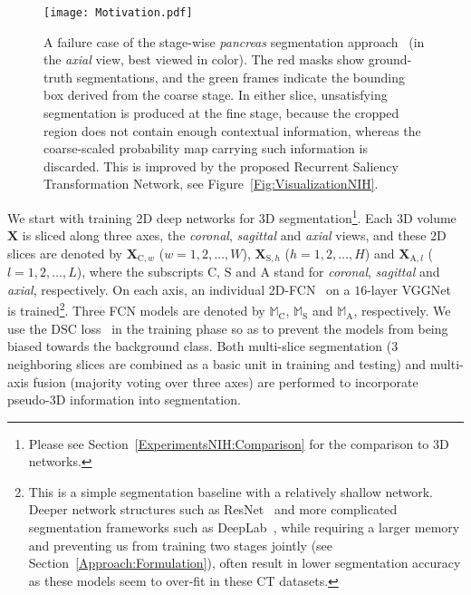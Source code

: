 \documentclass[10pt,twocolumn,letterpaper]{article}
\begin{document}
\renewcommand{\figurewidth}{8.0cm}
\begin{figure}[t]
\begin{center}
    \texttt{[image: Motivation.pdf]}
\end{center}
\caption{
    A failure case of the stage-wise {\em pancreas} segmentation approach~\cite{Zhou_2017_Fixed}
    (in the {\em axial} view, best viewed in color).
    The red masks show ground-truth segmentations,
    and the green frames indicate the bounding box derived from the coarse stage.
    In either slice, unsatisfying segmentation is produced at the fine stage,
    because the cropped region does not contain enough contextual information,
    whereas the coarse-scaled probability map carrying such information is discarded.
    This is improved by the proposed Recurrent Saliency Transformation Network, see Figure~\ref{Fig:VisualizationNIH}.
}
\label{Fig:Motivation}
\end{figure}

We start with training 2D deep networks for 3D segmentation\footnote{
Please see Section~\ref{ExperimentsNIH:Comparison} for the comparison to 3D networks.}.
Each 3D volume $\mathbf{X}$ is sliced along three axes, the {\em coronal}, {\em sagittal} and {\em axial} views,
and these 2D slices are denoted by $\mathbf{X}_{\mathrm{C},w}$ (${w}={1,2,\ldots,W}$),
$\mathbf{X}_{\mathrm{S},h}$ (${h}={1,2,\ldots,H}$) and $\mathbf{X}_{\mathrm{A},l}$ (${l}={1,2,\ldots,L}$),
where the subscripts $\mathrm{C}$, $\mathrm{S}$ and $\mathrm{A}$
stand for {\em coronal}, {\em sagittal} and {\em axial}, respectively.
On each axis, an individual 2D-FCN~\cite{Long_2015_Fully} on a $16$-layer VGGNet~\cite{Simonyan_2015_Very} is trained\footnote{
This is a simple segmentation baseline with a relatively shallow network.
Deeper network structures such as ResNet~\cite{He_2016_Deep}
and more complicated segmentation frameworks such as DeepLab~\cite{Chen_2015_Semantic},
while requiring a larger memory and preventing us from training two stages jointly (see Section~\ref{Approach:Formulation}),
often result in lower segmentation accuracy as these models seem to over-fit in these CT datasets.}.
Three FCN models are denoted by $\mathbb{M}_\mathrm{C}$, $\mathbb{M}_\mathrm{S}$ and $\mathbb{M}_\mathrm{A}$, respectively.
We use the DSC loss~\cite{Milletari_2016_VNet} in the training phase
so as to prevent the models from being biased towards the background class.
Both multi-slice segmentation ($3$ neighboring slices are combined as a basic unit in training and testing)
and multi-axis fusion (majority voting over three axes) are performed to incorporate pseudo-3D information into segmentation.
\end{document}
